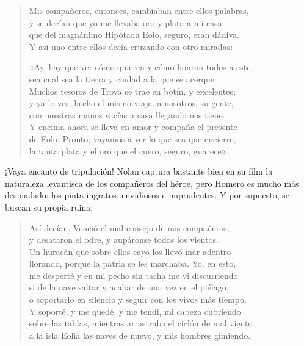 \documentclass[11pt,a4paper]{article}
\begin{document}
\begin{verse}
Mis compañeros, entonces, cambiaban entre ellos palabras,\\
y se decían que yo me llevaba oro y plata a mi casa\\
que del magnánimo Hipótada Eolo, seguro, eran dádiva.\\
Y así uno entre ellos decía cruzando con otro miradas:

«Ay, hay que ver cómo quieren y cómo honran todos a este,\\
sea cual sea la tierra y ciudad a la que se acerque.\\
Muchos tesoros de Troya se trae en botín, y excelentes;\\
y ya lo ves, hecho el mismo viaje, a nosotros, su gente,\\
con nuestras manos vacías a casa llegando nos tiene.\\
Y encima ahora se lleva en amor y compaña el presente\\
de Eolo. Pronto, vayamos a ver lo que sea que encierre,\\
la tanta plata y el oro que el cuero, seguro, guarece».
\end{verse}

¡Vaya encanto de tripulación! Nolan captura bastante bien en su film la naturaleza levantisca de los compañeros del héroe, pero Homero es mucho más despiadado: los pinta ingratos, envidiosos e imprudentes. Y por supuesto, se buscan su propia ruina:

\begin{verse}
Así decían. Venció el mal consejo de mis compañeros,\\
y desataron el odre, y aupáronse todos los vientos.\\
Un huracán que sobre ellos cayó los llevó mar adentro\\
llorando, porque la patria se les marchaba. Yo, en esto,\\
me desperté y en mi pecho sin tacha me vi discurriendo\\
si de la nave saltar y acabar de una vez en el piélago,\\
o soportarlo en silencio y seguir con los vivos más tiempo.\\
Y soporté, y me quedé, y me tendí, mi cabeza cubriendo\\
sobre las tablas, mientras arrastraba el ciclón de mal viento\\
a la isla Eolia las naves de nuevo, y mis hombres gimiendo.
\end{verse}
\end{document}
